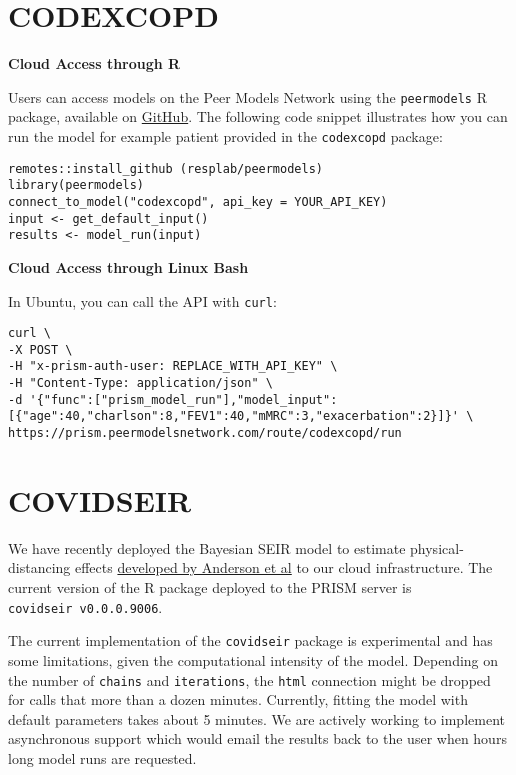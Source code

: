\documentclass[
]{book}
\begin{document}
\hypertarget{codexcopd-1}{%
\section{CODEXCOPD}\label{codexcopd-1}}

\textbf{Cloud Access through R}

Users can access models on the Peer Models Network using the \texttt{peermodels} R package, available on \href{https://github.com/resplab/peermodels}{GitHub}. The following code snippet illustrates how you can run the model for example patient provided in the \texttt{codexcopd} package:

\begin{verbatim}
remotes::install_github (resplab/peermodels)
library(peermodels)
connect_to_model("codexcopd", api_key = YOUR_API_KEY)
input <- get_default_input()
results <- model_run(input)
\end{verbatim}

\textbf{Cloud Access through Linux Bash}

In Ubuntu, you can call the API with \texttt{curl}:

\begin{verbatim}
curl \
-X POST \
-H "x-prism-auth-user: REPLACE_WITH_API_KEY" \
-H "Content-Type: application/json" \
-d '{"func":["prism_model_run"],"model_input":[{"age":40,"charlson":8,"FEV1":40,"mMRC":3,"exacerbation":2}]}' \
https://prism.peermodelsnetwork.com/route/codexcopd/run
\end{verbatim}

\hypertarget{covidseir-1}{%
\section{COVIDSEIR}\label{covidseir-1}}

We have recently deployed the Bayesian SEIR model to estimate physical-distancing effects \href{https://doi.org/10.1101/2020.04.17.20070086}{developed by Anderson et al} to our cloud infrastructure. The current version of the R package deployed to the PRISM server is \texttt{covidseir\ v0.0.0.9006}.

The current implementation of the \texttt{covidseir} package is experimental and has some limitations, given the computational intensity of the model. Depending on the number of \texttt{chains} and \texttt{iterations}, the \texttt{html} connection might be dropped for calls that more than a dozen minutes.
Currently, fitting the model with default parameters takes about 5 minutes. We are actively working to implement asynchronous support which would email the results back to the user when hours long model runs are requested.
\end{document}
